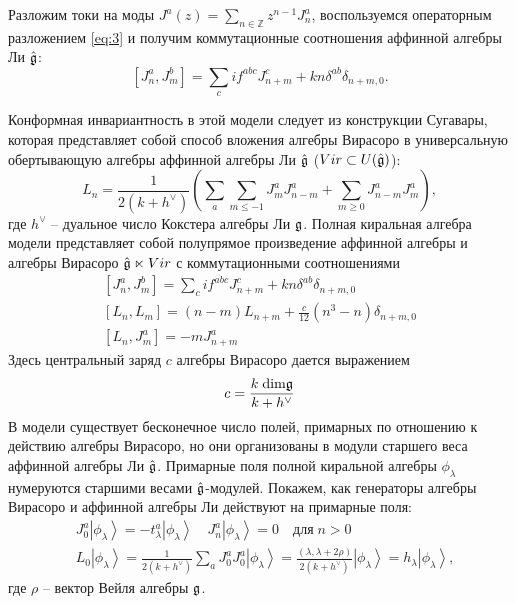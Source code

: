 Разложим токи на моды $J^a(z)=\sum\limits_{n\in \mathbb Z}z^{n-1}J^a_n $, воспользуемся операторным разложением \eqref{eq:3} и получим коммутационные соотношения аффинной алгебры Ли $\hat{\mathfrak{g}}$:
\begin{equation*}
 \left[J^a_n,J^b_m\right]=\sum_c i f^{abc}J^c_{n+m}+kn\delta^{ab}\delta_{n+m,0}.  
\end{equation*}

Конформная инвариантность в этой модели следует из конструкции Сугавары, которая представляет собой способ вложения алгебры Вирасоро в универсальную обертывающую алгебры аффинной алгебры Ли $\hat{\mathfrak{g}}$ ($Vir\subset U(\hat{\mathfrak{g}})$):
\begin{equation}
  \label{eq:4}
  L_n=\frac{1}{2(k+h^{\vee})}\left(\sum\limits_a\sum\limits_{m\leq -1}J^a_m J^a_{n-m}+\sum_{m\geq 0} J^{a}_{n-m}J^{a}_{m}\right), 
\end{equation}
где $h^{\vee}$ -- дуальное число Кокстера алгебры Ли $\mathfrak{g}$. 
Полная киральная алгебра модели представляет собой полупрямое произведение аффинной алгебры и алгебры Вирасоро $\hat{\mathfrak{g}} \ltimes Vir$ с коммутационными соотношениями
  \begin{equation}
    \label{eq:92}
    \begin{aligned}
      \left[J^a_n,J^b_m\right]=\sum_c i f^{abc}J^c_{n+m}+kn\delta^{ab}\delta_{n+m,0} \\
      \left[L_n,L_m\right]=(n-m)L_{n+m}+\frac{c}{12}(n^3-n)\delta_{n+m,0}\\
      \left[L_n,J^a_m\right]=-mJ^a_{n+m}
    \end{aligned}
  \end{equation}
Здесь центральный заряд  $c$ алгебры Вирасоро дается выражением
\begin{equation}
  \label{eq:25}
  c=\frac{k\;\mathrm{dim}\mathfrak{g}}{k+h^{\vee}}
\end{equation}
В модели существует бесконечное число полей, примарных по отношению к действию алгебры Вирасоро, но они организованы в модули старшего веса аффинной алгебры Ли $\hat{\mathfrak{g}}$. Примарные поля полной киральной алгебры  $\phi_{\lambda}$ нумеруются старшими весами  $\hat{\mathfrak{g}}$-модулей. Покажем, как генераторы алгебры Вирасоро и аффинной алгебры Ли действуют на примарные поля:
  \begin{equation*}
    \begin{aligned}
      & J_0^a\left|\phi_{\lambda}\right>=-t^a_{\lambda}\left|\phi_{\lambda}\right>  \quad    J^a_n\left|\phi_{\lambda}\right>=0 \quad \text{для}\; n>0 \\
      & L_0\left|\phi_{\lambda}\right>=\frac{1}{2(k+h^{\vee})}\sum_aJ^a_0J^a_0\left|\phi_{\lambda}\right>=\frac{(\lambda,\lambda+2\rho)}{2(k+h^{\vee})}\left|\phi_{\lambda}\right>=h_{\lambda} \left|\phi_{\lambda}\right>,
    \end{aligned}
  \end{equation*}
где $\rho$ -- вектор Вейля алгебры $\mathfrak{g}$. 

